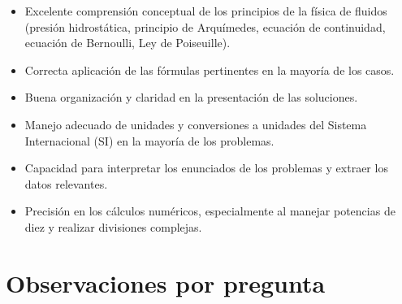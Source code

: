 \documentclass[11pt,a4paper]{article}
\begin{document}
\vspace{4pt}
\begin{minipage}[t]{0.48\linewidth}
  \begin{tcolorbox}[cajaFortaleza, title={Fortalezas}]
\begin{itemize}[leftmargin=1.5em, itemsep=2pt]
  \item Excelente comprensión conceptual de los principios de la física de fluidos (presión hidrostática, principio de Arquímedes, ecuación de continuidad, ecuación de Bernoulli, Ley de Poiseuille).
  \item Correcta aplicación de las fórmulas pertinentes en la mayoría de los casos.
  \item Buena organización y claridad en la presentación de las soluciones.
  \item Manejo adecuado de unidades y conversiones a unidades del Sistema Internacional (SI) en la mayoría de los problemas.
  \item Capacidad para interpretar los enunciados de los problemas y extraer los datos relevantes.
\end{itemize}
  \end{tcolorbox}
\end{minipage}
\hfill
\begin{minipage}[t]{0.48\linewidth}
  \begin{tcolorbox}[cajaMejora, title={Areas de mejora}]
\begin{itemize}[leftmargin=1.5em, itemsep=2pt]
  \item Precisión en los cálculos numéricos, especialmente al manejar potencias de diez y realizar divisiones complejas.
\end{itemize}
  \end{tcolorbox}
\end{minipage}

\section*{Observaciones por pregunta}
\end{document}
